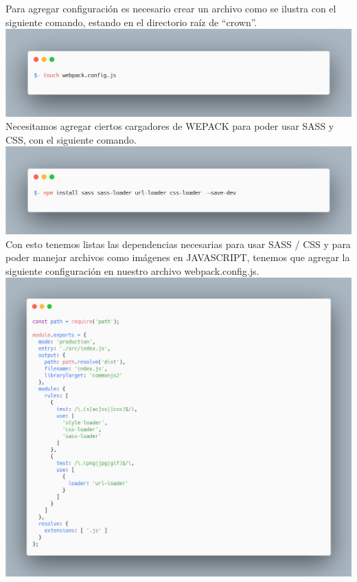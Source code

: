 Para agregar configuración es necesario crear un archivo como se ilustra con el siguiente comando, estando en el directorio raíz de “crown”.
\newline
\newline
\includegraphics[width=1\textwidth]{./Imagenes/image38.png}
\newline
Necesitamos agregar ciertos cargadores de WEPACK para poder usar SASS y CSS, con el siguiente comando.
\newline
\newline
\includegraphics[width=1\textwidth]{./Imagenes/image8.png}
\newline
Con esto tenemos listas las dependencias necesarias para usar SASS / CSS y para poder manejar archivos como imágenes en JAVASCRIPT, tenemos que agregar la siguiente configuración en nuestro archivo webpack.config.js.
\newline
\newline
\includegraphics[width=1\textwidth]{./Imagenes/image2.png}
